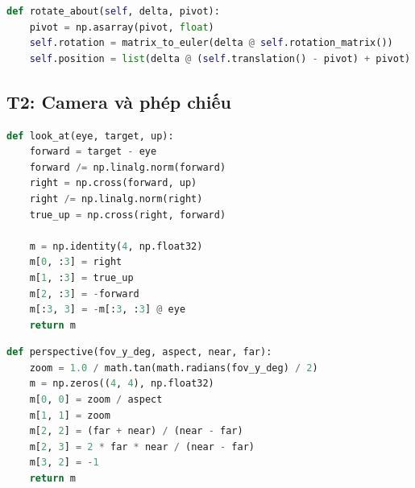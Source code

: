 \documentclass[9pt,twocolumn,a4paper]{extarticle}
\newcommand{\code}[1]{\texttt{#1}}
\begin{document}
\begin{minipage}{\linewidth}
\begin{lstlisting}[language=Python,caption={\code{core/transform.py}, \code{Transform.rotate\_about}},label={lst:pivot}]
def rotate_about(self, delta, pivot):
    pivot = np.asarray(pivot, float)
    self.rotation = matrix_to_euler(delta @ self.rotation_matrix())
    self.position = list(delta @ (self.translation() - pivot) + pivot)
\end{lstlisting}
\end{minipage}
\par\vspace{4pt}


\subsection{T2: Camera và phép chiếu}
\begin{minipage}{\linewidth}
\begin{lstlisting}[language=Python,caption={\code{core/math3d.py}, \code{look\_at}: ma trận nhìn $\mathbf{V}$},label={lst:lookat}]
def look_at(eye, target, up):
    forward = target - eye
    forward /= np.linalg.norm(forward)
    right = np.cross(forward, up)
    right /= np.linalg.norm(right)
    true_up = np.cross(right, forward)

    m = np.identity(4, np.float32)
    m[0, :3] = right
    m[1, :3] = true_up
    m[2, :3] = -forward
    m[:3, 3] = -m[:3, :3] @ eye
    return m
\end{lstlisting}
\end{minipage}
\par\vspace{4pt}

\begin{minipage}{\linewidth}
\begin{lstlisting}[language=Python,caption={\code{core/math3d.py}, \code{perspective}: ma trận chiếu $\mathbf{P}$},label={lst:persp}]
def perspective(fov_y_deg, aspect, near, far):
    zoom = 1.0 / math.tan(math.radians(fov_y_deg) / 2)
    m = np.zeros((4, 4), np.float32)
    m[0, 0] = zoom / aspect
    m[1, 1] = zoom
    m[2, 2] = (far + near) / (near - far)
    m[2, 3] = 2 * far * near / (near - far)
    m[3, 2] = -1
    return m
\end{lstlisting}
\end{minipage}
\par\vspace{4pt}
\end{document}
